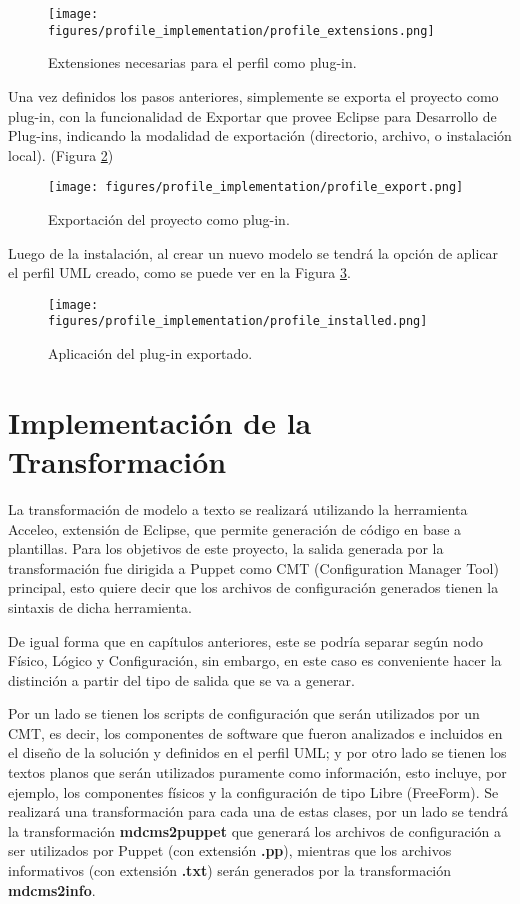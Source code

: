 \begin{figure}[H]
    \centering
    \texttt{[image: figures/profile\_implementation/profile\_extensions.png]}
    \caption{Extensiones necesarias para el perfil como plug-in.}
    \label{fig:profile:extensions}
\end{figure}

Una vez definidos los pasos anteriores, simplemente se exporta el proyecto como plug-in, con la funcionalidad de Exportar que provee Eclipse para Desarrollo de Plug-ins, indicando la modalidad de exportación (directorio, archivo, o instalación local). (Figura \ref{fig:profile:plugin_export})

\begin{figure}[H]
    \centering
    \texttt{[image: figures/profile\_implementation/profile\_export.png]}
    \caption{Exportación del proyecto como plug-in.}
    \label{fig:profile:plugin_export}
\end{figure}

Luego de la instalación, al crear un nuevo modelo se tendrá la opción de aplicar el perfil UML creado, como se puede ver en la Figura \ref{fig:profile:apply}.

\begin{figure}[htbp]
    \centering
    \texttt{[image: figures/profile\_implementation/profile\_installed.png]}
    \caption{Aplicación del plug-in exportado.}
    \label{fig:profile:apply}
\end{figure}

\section{Implementación de la Transformación}

La transformación de modelo a texto se realizará utilizando la herramienta Acceleo, extensión de Eclipse, que permite generación de código en base a plantillas. Para los objetivos de este proyecto, la salida generada por la transformación fue dirigida a Puppet como CMT (Configuration Manager Tool) principal, esto quiere decir que los archivos de configuración generados tienen la sintaxis de dicha herramienta.

De igual forma que en capítulos anteriores, este se podría separar según nodo Físico, Lógico y Configuración, sin embargo, en este caso es conveniente hacer la distinción a partir del tipo de salida que se va a generar. 

Por un lado se tienen los scripts de configuración que serán utilizados por un CMT, es decir, los componentes de software que fueron analizados e incluidos en el diseño de la solución y definidos en el perfil UML; y por otro lado se tienen los textos planos que serán utilizados puramente como información, esto incluye, por ejemplo, los componentes físicos y la configuración de tipo Libre (FreeForm). 
Se realizará una transformación para cada una de estas clases, por un lado se tendrá la transformación \textbf{mdcms2puppet} que generará los archivos de configuración a ser utilizados por Puppet (con extensión \textbf{.pp}), mientras que los archivos informativos (con extensión \textbf{.txt}) serán generados por la transformación \textbf{mdcms2info}.

